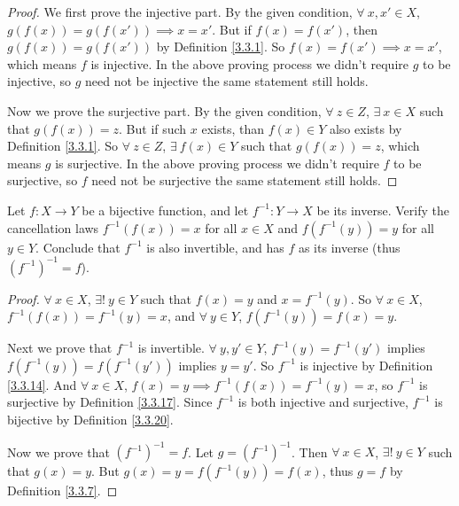 \begin{proof}
We first prove the injective part.
By the given condition, \(\forall\ x, x' \in X\), \(g(f(x)) = g(f(x')) \implies x = x'\).
But if \(f(x) = f(x')\), then \(g(f(x)) = g(f(x'))\) by Definition \ref{3.3.1}.
So \(f(x) = f(x') \implies x = x'\), which means \(f\) is injective.
In the above proving process we didn't require \(g\) to be injective, so \(g\) need not be injective the same statement still holds.

Now we prove the surjective part.
By the given condition, \(\forall\ z \in Z\), \(\exists\ x \in X\) such that \(g(f(x)) = z\).
But if such \(x\) exists, than \(f(x) \in Y\) also exists by Definition \ref{3.3.1}.
So \(\forall\ z \in Z\), \(\exists\ f(x) \in Y\) such that \(g(f(x)) = z\), which means \(g\) is surjective.
In the above proving process we didn't require \(f\) to be surjective, so \(f\) need not be surjective the same statement still holds.
\end{proof}

\begin{exercise}\label{ex 3.3.6}
Let \(f : X \to Y\) be a bijective function, and let \(f^{-1} : Y \to X\) be its inverse.
Verify the cancellation laws \(f^{-1}(f(x)) = x\) for all \(x \in X\) and \(f(f^{-1}(y)) = y\) for all \(y \in Y\).
Conclude that \(f^{-1}\) is also invertible, and has \(f\) as its inverse (thus \((f^{-1})^{-1} = f\)).
\end{exercise}

\begin{proof}
\(\forall\ x \in X\), \(\exists!\ y \in Y\) such that \(f(x) = y\) and \(x = f^{-1}(y)\).
So \(\forall\ x \in X\), \(f^{-1}(f(x)) = f^{-1}(y) = x\), and \(\forall\ y \in Y\), \(f(f^{-1}(y)) = f(x) = y\).

Next we prove that \(f^{-1}\) is invertible.
\(\forall\ y, y' \in Y\), \(f^{-1}(y) = f^{-1}(y')\) implies \(f(f^{-1}(y)) = f(f^{-1}(y'))\) implies \(y = y'\).
So \(f^{-1}\) is injective by Definition \ref{3.3.14}.
And \(\forall\ x \in X\), \(f(x) = y \implies f^{-1}(f(x)) = f^{-1}(y) = x\), so \(f^{-1}\) is surjective by Definition \ref{3.3.17}.
Since \(f^{-1}\) is both injective and surjective, \(f^{-1}\) is bijective by Definition \ref{3.3.20}.

Now we prove that \((f^{-1})^{-1} = f\).
Let \(g = (f^{-1})^{-1}\).
Then \(\forall\ x \in X\), \(\exists!\ y \in Y\) such that \(g(x) = y\).
But \(g(x) = y = f(f^{-1}(y)) = f(x)\), thus \(g = f\) by Definition \ref{3.3.7}.
\end{proof}

